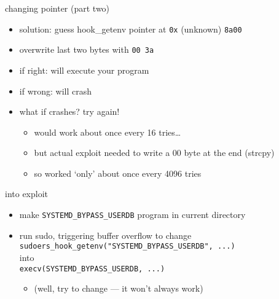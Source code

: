 \begin{frame}{changing pointer (part two)}
\begin{itemize}
\item solution: guess hook\_getenv pointer at  \texttt{0x} (unknown) \texttt{8a00}
\item overwrite last two bytes with \texttt{00 3a}
\vspace{.5cm}
\item if right: will execute your program
\item if wrong: will crash
\vspace{.5cm}
\item<2-> what if crashes? try again! 
    \begin{itemize}
    \item would work about once every 16 tries\ldots
    \item but actual exploit needed to write a 00 byte at the end (strcpy)
    \item so worked `only' about once every 4096 tries
    \end{itemize}
\end{itemize}
\end{frame}

\begin{frame}{into exploit}
\begin{itemize}
\item make \texttt{SYSTEMD\_BYPASS\_USERDB} program in current directory
\item run sudo, triggering buffer overflow to change \\ \texttt{\small sudoers\_hook\_getenv("SYSTEMD\_BYPASS\_USERDB", ...)} \\  into \\
      \texttt{\small execv(SYSTEMD\_BYPASS\_USERDB, ...)} 
    \begin{itemize}
    \item (well, try to change --- it won't always work)
    \end{itemize}
\end{itemize}
\end{frame}
